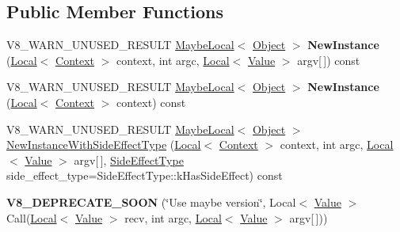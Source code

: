 \subsection*{Public Member Functions}
\begin{DoxyCompactItemize}
\item 
\mbox{\label{classv8_1_1Function_ade57f07a67ad99630573b1c5b905a579}} 
V8\+\_\+\+W\+A\+R\+N\+\_\+\+U\+N\+U\+S\+E\+D\+\_\+\+R\+E\+S\+U\+LT \mbox{\hyperlink{classv8_1_1MaybeLocal}{Maybe\+Local}}$<$ \mbox{\hyperlink{classv8_1_1Object}{Object}} $>$ {\bfseries New\+Instance} (\mbox{\hyperlink{classv8_1_1Local}{Local}}$<$ \mbox{\hyperlink{classv8_1_1Context}{Context}} $>$ context, int argc, \mbox{\hyperlink{classv8_1_1Local}{Local}}$<$ \mbox{\hyperlink{classv8_1_1Value}{Value}} $>$ argv\mbox{[}$\,$\mbox{]}) const
\item 
\mbox{\label{classv8_1_1Function_ab491afc6bdf1d5174fe55d5cfad4ffe9}} 
V8\+\_\+\+W\+A\+R\+N\+\_\+\+U\+N\+U\+S\+E\+D\+\_\+\+R\+E\+S\+U\+LT \mbox{\hyperlink{classv8_1_1MaybeLocal}{Maybe\+Local}}$<$ \mbox{\hyperlink{classv8_1_1Object}{Object}} $>$ {\bfseries New\+Instance} (\mbox{\hyperlink{classv8_1_1Local}{Local}}$<$ \mbox{\hyperlink{classv8_1_1Context}{Context}} $>$ context) const
\item 
V8\+\_\+\+W\+A\+R\+N\+\_\+\+U\+N\+U\+S\+E\+D\+\_\+\+R\+E\+S\+U\+LT \mbox{\hyperlink{classv8_1_1MaybeLocal}{Maybe\+Local}}$<$ \mbox{\hyperlink{classv8_1_1Object}{Object}} $>$ \mbox{\hyperlink{classv8_1_1Function_a3563e1a0f7de54f2d493a93a4e5e3b69}{New\+Instance\+With\+Side\+Effect\+Type}} (\mbox{\hyperlink{classv8_1_1Local}{Local}}$<$ \mbox{\hyperlink{classv8_1_1Context}{Context}} $>$ context, int argc, \mbox{\hyperlink{classv8_1_1Local}{Local}}$<$ \mbox{\hyperlink{classv8_1_1Value}{Value}} $>$ argv\mbox{[}$\,$\mbox{]}, \mbox{\hyperlink{namespacev8_a29711319c2b9fc7716d65faee2f7b9cb}{Side\+Effect\+Type}} side\+\_\+effect\+\_\+type=Side\+Effect\+Type\+::k\+Has\+Side\+Effect) const
\item 
\mbox{\label{classv8_1_1Function_a013663cd170e5b27ec9e2b54e72f3e3d}} 
{\bfseries V8\+\_\+\+D\+E\+P\+R\+E\+C\+A\+T\+E\+\_\+\+S\+O\+ON} (\char`\"{}Use maybe version\char`\"{}, Local$<$ \mbox{\hyperlink{classv8_1_1Value}{Value}} $>$ Call(\mbox{\hyperlink{classv8_1_1Local}{Local}}$<$ \mbox{\hyperlink{classv8_1_1Value}{Value}} $>$ recv, int argc, \mbox{\hyperlink{classv8_1_1Local}{Local}}$<$ \mbox{\hyperlink{classv8_1_1Value}{Value}} $>$ argv\mbox{[}$\,$\mbox{]}))

\end{DoxyCompactItemize}
